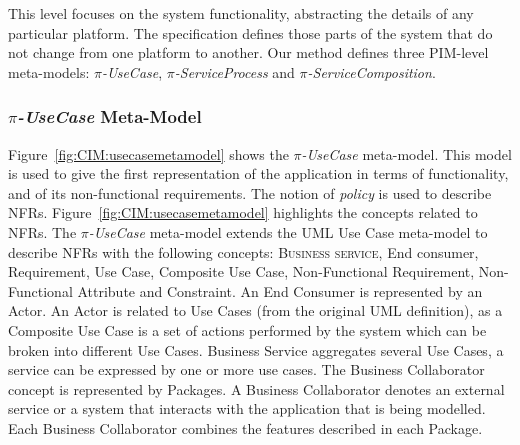 \documentclass{singlecol-new}
\theoremstyle{TH}{
\newtheorem{lemma}{Lemma}
\newtheorem{theorem}[lemma]{Theorem}
\newtheorem{corrolary}[lemma]{Corrolary}
\newtheorem{conjecture}[lemma]{Conjecture}
\newtheorem{proposition}[lemma]{Proposition}
\newtheorem{claim}[lemma]{Claim}
\newtheorem{stheorem}[lemma]{Wrong Theorem}
\newtheorem{algorithm}{Algorithm}
}
\theoremstyle{THrm}{
\newtheorem{definition}{Definition}[section]
\newtheorem{question}{Question}[section]
\newtheorem{remark}{Remark}
\newtheorem{scheme}{Scheme}
}
\theoremstyle{THhit}{
\newtheorem{case}{Case}[section]
}
\theoremstyle{THhsl}{
\newtheorem{example}{Example}
}
\begin{document}
This level focuses on the system functionality, abstracting the details of any particular platform.
The specification defines those parts of the system that do not change from one platform to another.
Our method defines three PIM-level meta-models: \textit{$\pi$-UseCase}, \textit{$\pi$-Ser\-vice\-Pro\-cess} and \textit{$\pi$-ServiceComposition}.

\subsubsection{\textit{$\pi$-UseCase} Meta-Model}

Figure~\ref{fig:CIM:usecasemetamodel} shows the \textit{$\pi$-UseCase} meta-model.
This model is  used to give the first representation of the application in terms of functionality, and of its non-func\-tion\-al requirements.
The notion of \textit{policy} is used to describe NFRs.
Figure~\ref{fig:CIM:usecasemetamodel} highlights the concepts related to NFRs.
The \textit{$\pi$-UseCase} meta-model extends the UML Use Case meta-model to describe NFRs with  the following  concepts:  \textsc{Business service}\footnotemark {}, {\sc End consumer}, {\sc Requirement}, {\sc Use Case}, {\sc Composite Use Case}, {\sc Non-\-Func\-tion\-al Requirement}, {\sc Non-Functional} {\sc At\-tri\-bute} and {\sc Constraint}.
An {\sc End Consumer} is represented by an {\sc Actor}.
An  {\sc Actor} is related to {\sc Use Cases} (from the original UML definition), as a {\sc  Composite Use Case} is a set of actions performed by the system which can be broken into different {\sc Use Cases}.
{\sc  Business Service} aggregates several {\sc Use Cases},  a service can be expressed by one or more use cases.
 The {\sc Business Collaborator} concept is represented  by {\sc Packages}.
A {\sc Business Collaborator} denotes an external service or a system that interacts with the application that is being modelled.
Each {\sc Business Collaborator} combines the features described in each  {\sc Package}.
\end{document}
